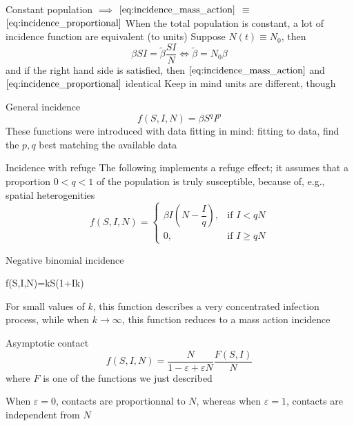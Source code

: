 \documentclass[aspectratio=43]{beamer}
\begin{document}
\begin{frame}{Constant population $\implies$ $\eqref{eq:incidence_mass_action}$ $\equiv$ $\eqref{eq:incidence_proportional}$}
When the total population is constant, a lot of incidence function are equivalent (to units)
\vfill
Suppose $N(t)\equiv N_0$, then
$$
\beta SI = \tilde\beta\frac{SI}{N}
\iff \tilde\beta=N_0\beta
$$
and if the right hand side is satisfied, then $\eqref{eq:incidence_mass_action}$ and $\eqref{eq:incidence_proportional}$ identical
\vfill
Keep in mind units are different, though
\end{frame}


\begin{frame}{General incidence}
\begin{equation}\label{eq:general_incidence}
f(S,I,N)=\beta S^q I^p
\end{equation}
These functions were introduced with data fitting in mind: fitting to data, find the $p,q$ best matching the available data
\end{frame}


\begin{frame}{Incidence with refuge}
The following implements a refuge effect; it assumes that a proportion $0<q<1$ of the population is truly susceptible, because of, e.g., spatial heterogenities
\vfill
\begin{equation}\label{eq:incidence_with_refuge}
f(S,I,N)=
\begin{cases}
\beta I\left(N-\dfrac Iq\right),&\textrm{if }I<qN \\
0,&\textrm{if }I\geq qN
\end{cases}
\end{equation}
\end{frame}


\begin{frame}{Negative binomial incidence}
\begin{frame}\label{eq:neg_binom_incidence}
f(S,I,N)=kS\ln\left(1+\beta\frac Ik\right)
\end{frame}
\vfill
For small values of $k$, this function describes a very concentrated infection process, while when $k\to\infty$, this function reduces to a mass action incidence
\end{frame}


\begin{frame}{Asymptotic contact}
$$
f(S,I,N)
=\frac{N}{1-\varepsilon+\varepsilon N}
\frac{F(S,I)}{N}
$$
where $F$ is one of the functions we just described

When $\varepsilon=0$, contacts are proportionnal to $N$, whereas when $\varepsilon=1$, contacts are independent from $N$
\end{frame}
\end{document}
